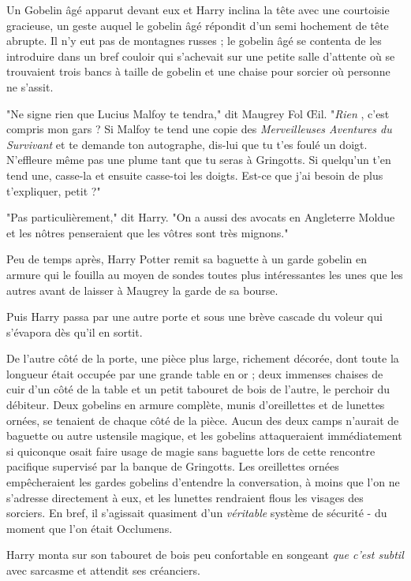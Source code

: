 Un Gobelin âgé apparut devant eux et Harry inclina la tête avec une courtoisie gracieuse, un geste auquel le gobelin âgé répondit d'un semi hochement de tête abrupte. Il n'y eut pas de montagnes russes ; le gobelin âgé se contenta de les introduire dans un bref couloir qui s'achevait sur une petite salle d'attente où se trouvaient trois bancs à taille de gobelin et une chaise pour sorcier où personne ne s'assit.

"Ne signe rien que Lucius Malfoy te tendra," dit Maugrey Fol Œil. "\emph{Rien} , c'est compris mon gars ? Si Malfoy te tend une copie des \emph{Merveilleuses Aventures du Survivant}  et te demande ton autographe, dis-lui que tu t'es foulé un doigt. N'effleure même pas une plume tant que tu seras à Gringotts. Si quelqu'un t'en tend une, casse-la et ensuite casse-toi les doigts. Est-ce que j'ai besoin de plus t'expliquer, petit ?"

"Pas particulièrement," dit Harry. "On a aussi des avocats en Angleterre Moldue et les nôtres penseraient que les vôtres sont très mignons."

Peu de temps après, Harry Potter remit sa baguette à un garde gobelin en armure qui le fouilla au moyen de sondes toutes plus intéressantes les unes que les autres avant de laisser à Maugrey la garde de sa bourse.

Puis Harry passa par une autre porte et sous une brève cascade du voleur qui s'évapora dès qu'il en sortit.

De l'autre côté de la porte, une pièce plus large, richement décorée, dont toute la longueur était occupée par une grande table en or ; deux immenses chaises de cuir d'un côté de la table et un petit tabouret de bois de l'autre, le perchoir du débiteur. Deux gobelins en armure complète, munis d'oreillettes et de lunettes ornées, se tenaient de chaque côté de la pièce. Aucun des deux camps n'aurait de baguette ou autre ustensile magique, et les gobelins attaqueraient immédiatement si quiconque osait faire usage de magie sans baguette lors de cette rencontre pacifique supervisé par la banque de Gringotts. Les oreillettes ornées empêcheraient les gardes gobelins d'entendre la conversation, à moins que l'on ne s'adresse directement à eux, et les lunettes rendraient flous les visages des sorciers. En bref, il s'agissait quasiment d'un \emph{véritable}  système de sécurité - du moment que l'on était Occlumens.

Harry monta sur son tabouret de bois peu confortable en songeant \emph{que c'est subtil}  avec sarcasme et attendit ses créanciers.

